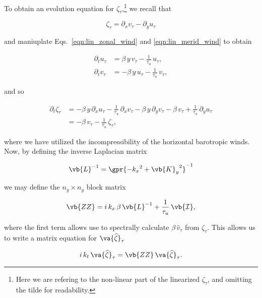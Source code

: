 To obtain an evolution equation for $\zeta_\tau$,\footnote{Here we are refering to the non-linear part of the linearized $\zeta_\tau$, and omitting the tilde for readability.} we recall that

\begin{equation}
	\zeta_{\tau} = \partial_x v_{\tau} - \partial_y u_{\tau}
\end{equation}

and maniuplate Eqs.~\ref{eqn:lin_zonal_wind} and \ref{eqn:lin_merid_wind} to obtain

\begin{subequations}
	\begin{align}
		\partial_t u_{\tau} &= \beta\,y\,v_{\tau} - \frac{1}{\tau_u}\,u_{\tau},\\
		\partial_t v_{\tau} &= -\beta\,y\,u_{\tau} - \frac{1}{\tau_u}\,v_{\tau},
	\end{align}
\end{subequations}

and so

\begin{align}
	\partial_t \zeta_\tau &= -\beta\,y\,\partial_x u_\tau - \frac{1}{\tau_u}\,\partial_x v_{\tau} - \beta\,y\,\partial_y v_{\tau} - \beta\,v_{\tau} + \frac{1}{\tau_u}\,\partial_y u_{\tau} \nonumber \\
		&= - \beta\,v_{\tau} - \frac{1}{\tau_u}\,\zeta_{\tau},
\end{align}

where we have utilized the incompressibility of the horizontal barotropic winds. Now, by defining the inverse Laplacian matrix 

\begin{equation}
	\vb{L}^{-1} = \gpr{-{k_x}^2 + {\vb{K}_y}^2}^{-1}
\end{equation}


we may define the $n_y \times n_y$ block matrix

\begin{equation}
	\vb{Z Z} = i\,k_x\,\beta\,\vb{L}^{-1} + \frac{1}{\tau_u}\,\vb{\mathcal{I}},
\end{equation}

where the first term allows use to spectrally calculate $\beta\,\widehat{v}_{\tau}$ from $\zeta_{\tau}$. This allows us to write a matrix equation for $\va{\widehat{\zeta}}_\tau$

\begin{equation}
	i\,k_t\,\va{\widehat{\zeta}}_{\tau} = \vb{ZZ}\,\va{\widehat{\zeta}}_{\tau}.
\end{equation}

